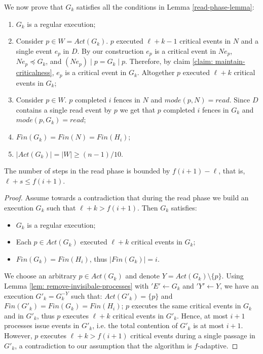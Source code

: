 We now prove that $G_k$ satisfies all the conditions in Lemma \ref{read-phase-lemma}:
\begin{enumerate}[(1)]
	\item $G_k$ is a regular execution;
	\item Consider $p \in W = Act(G_k)$. $p$ executed $\ell+k-1$ critical events in $N$ and a single event $e_p$ in $D$. By our construction $e_p$ is a critical event in $N e_p$, $N e_p \preceq G_k$, and $(N e_p) \mid p = G_k \mid p$. Therefore, by claim \ref{claim: maintain-criticalness}, $e_p$ is a critical event in $G_k$. Altogether $p$ executed $\ell+k$ critical events in $G_k$;
	\item Consider $p \in W$. $p$ completed $i$ fences in $N$ and $mode(p,N) = read$. Since $D$ contains a single read event by $p$ we get that $p$ completed $i$ fences in $G_k$ and $mode(p,G_k) = read$;
	\item $Fin(G_k) = Fin(N) = Fin(H_i)$;
	\item $|Act(G_k)| = |W| \geq (n-1)/10$.
\end{enumerate}

\begin{claim-section} \label{claim: read-upper-bound}
	The number of steps in the read phase is bounded by $f(i+1)-\ell$, that is, $\ell+s \leq f(i+1)$.
\end{claim-section}

\begin{proof}
	Assume towards a contradiction that during the read phase we build an execution $G_k$ such that $\ell+k > f(i+1)$. Then $G_k$ satisfies:
	\begin{itemize}
		\item $G_k$ is a regular execution;
		\item Each $p \in Act(G_k)$ executed $\ell+k$ critical events in $G_k$;
		\item $Fin(G_k) = Fin(H_i)$, thus $|Fin(G_k)| = i$.
	\end{itemize}
	We choose an arbitrary $p \in Act(G_k)$ and denote $Y = Act(G_k) \setminus \{p\}$. Using Lemma \ref{lem: remove-invisibale-processes} with $'E' \leftarrow G_k$ and $'Y' \leftarrow Y$, we have an execution $G'_k = G_k^{-Y}$ such that: $Act(G'_k) = \{p\}$ and $Fin(G'_k) = Fin(G_k) = Fin(H_i)$; $p$ executes the same critical events in $G_k$ and in $G'_k$, thus $p$ executes $\ell+k$ critical events in $G'_k$. Hence, at most $i+1$ processes issue events in $G'_k$, i.e. the total contention of $G'_k$ is at most $i+1$. However, $p$ executes $\ell+k > f(i+1)$ critical events during a single passage in $G'_k$, a contradiction to our assumption that the algorithm is $f$-adaptive.
\end{proof}






